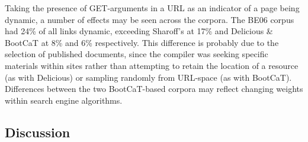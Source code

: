 Taking the presence of GET-arguments in a URL 
as an indicator of a page being dynamic, a number of effects may be seen across the corpora.  The BE06 corpus had 24\% of all links dynamic, exceeding Sharoff's at 17\% and Delicious \& BootCaT at 8\% and 6\% respectively.  This difference is probably due to the selection of published documents, since the compiler was seeking specific materials within sites rather than attempting to retain the location of a resource (as with Delicious) or sampling randomly from URL-space (as with BootCaT).  Differences between the two BootCaT-based corpora may reflect changing weights within search engine algorithms. %












\subsection{Discussion}


